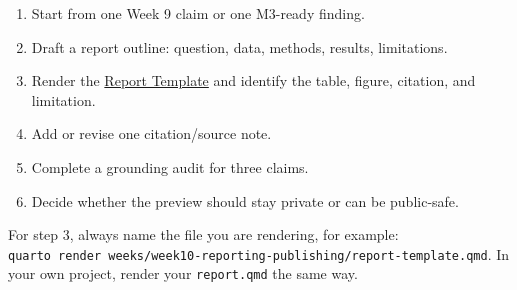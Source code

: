 \documentclass[
  letterpaper,
  DIV=11,
  numbers=noendperiod,
  oneside]{scrreprt}
\providecommand{\tightlist}{%
  \setlength{\itemsep}{0pt}\setlength{\parskip}{0pt}}
\begin{document}

\begin{enumerate}
\def\labelenumi{\arabic{enumi}.}
\tightlist
\item
  Start from one Week 9 claim or one M3-ready finding.
\item
  Draft a report outline: question, data, methods, results, limitations.
\item
  Render the \href{report-template.qmd}{Report Template} and identify
  the table, figure, citation, and limitation.
\item
  Add or revise one citation/source note.
\item
  Complete a grounding audit for three claims.
\item
  Decide whether the preview should stay private or can be public-safe.
\end{enumerate}

For step 3, always name the file you are rendering, for example:
\texttt{quarto\ render\ weeks/week10-reporting-publishing/report-template.qmd}.
In your own project, render your \texttt{report.qmd} the same way.
\end{document}
